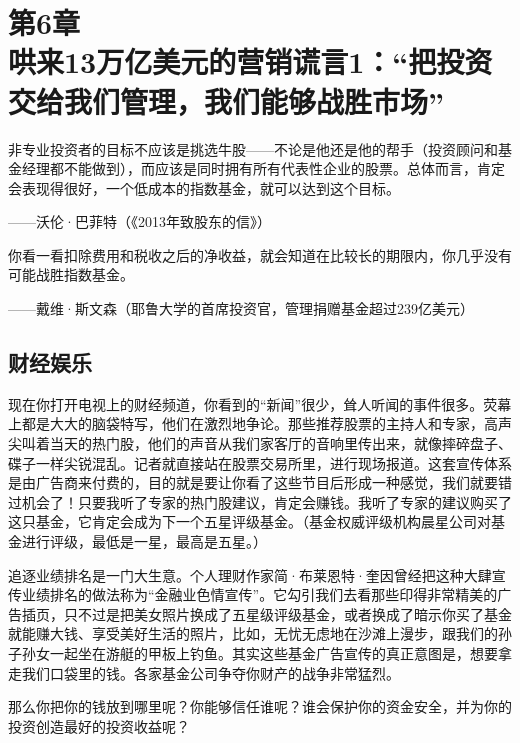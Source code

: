 
\section[第6章\q 哄来13万亿美元的营销谎言1：“把投资交给我们管理，我们能够战胜市场”]{第6章\\ 哄来13万亿美元的营销谎言1：“把投资交给我们管理，我们能够战胜市场”}

\begin{BookQuote}
非专业投资者的目标不应该是挑选牛股——不论是他还是他的帮手（投资顾问和基金经理都不能做到），而应该是同时拥有所有代表性企业的股票。总体而言，肯定会表现得很好，一个低成本的指数基金，就可以达到这个目标。

\hfill ——沃伦·巴菲特（《2013年致股东的信》）
\end{BookQuote}

\begin{BookQuote}
你看一看扣除费用和税收之后的净收益，就会知道在比较长的期限内，你几乎没有可能战胜指数基金。

\hfill ——戴维·斯文森（耶鲁大学的首席投资官，管理捐赠基金超过239亿美元）
\end{BookQuote}

\subsection{财经娱乐}

现在你打开电视上的财经频道，你看到的“新闻”很少，耸人听闻的事件很多。荧幕上都是大大的脑袋特写，他们在激烈地争论。那些推荐股票的主持人和专家，高声尖叫着当天的热门股，他们的声音从我们家客厅的音响里传出来，就像摔碎盘子、碟子一样尖锐混乱。记者就直接站在股票交易所里，进行现场报道。这套宣传体系是由广告商来付费的，目的就是要让你看了这些节目后形成一种感觉，我们就要错过机会了！只要我听了专家的热门股建议，肯定会赚钱。我听了专家的建议购买了这只基金，它肯定会成为下一个五星评级基金。（基金权威评级机构晨星公司对基金进行评级，最低是一星，最高是五星。）

追逐业绩排名是一门大生意。个人理财作家简·布莱恩特·奎因曾经把这种大肆宣传业绩排名的做法称为“金融业色情宣传”。它勾引我们去看那些印得非常精美的广告插页，只不过是把美女照片换成了五星级评级基金，或者换成了暗示你买了基金就能赚大钱、享受美好生活的照片，比如，无忧无虑地在沙滩上漫步，跟我们的孙子孙女一起坐在游艇的甲板上钓鱼。其实这些基金广告宣传的真正意图是，想要拿走我们口袋里的钱。各家基金公司争夺你财产的战争非常猛烈。

那么你把你的钱放到哪里呢？你能够信任谁呢？谁会保护你的资金安全，并为你的投资创造最好的投资收益呢？


